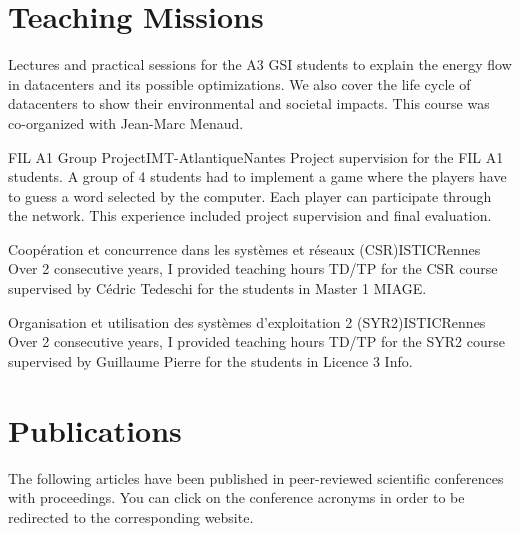 \documentclass[11pt,a4paper]{moderncv}
\begin{document}

\section{Teaching Missions}

  {Lectures and practical sessions for the A3 GSI students to explain the energy flow in datacenters and its possible optimizations. We also cover the life cycle of datacenters to show their environmental and societal impacts. This course was co-organized with Jean-Marc Menaud.}
\vspace{0.6em}

  {FIL A1 Group Project}{IMT-Atlantique}{Nantes}{}
  {Project supervision for the FIL A1 students. A group of 4 students had to implement a game where the players have to guess a word selected by the computer. Each player can participate through the network. This experience included project supervision and final evaluation.}
\vspace{0.6em}

  {Coopération et concurrence dans les systèmes et réseaux (CSR)}{ISTIC}{Rennes}{}
  {Over 2 consecutive years, I provided teaching hours TD/TP for the CSR course supervised by Cédric Tedeschi for the students in Master 1 MIAGE.}
\vspace{0.6em}

  {Organisation et utilisation des systèmes d'exploitation 2 (SYR2)}{ISTIC}{Rennes}{}
  {Over 2 consecutive years, I provided teaching hours TD/TP for the SYR2 course supervised by Guillaume Pierre for the students in Licence 3 Info.}

\newpage

\section{Publications}

The following articles have been published in peer-reviewed scientific conferences with proceedings. You can click on the conference acronyms in order to be redirected to the corresponding website. 
\end{document}
